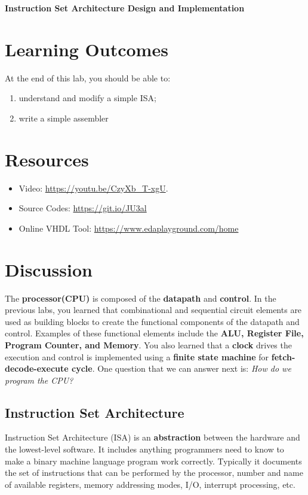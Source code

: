 \documentclass[a4paper, 11pt,oneside]{article}
\begin{document}
\begin{center}
	{\LARGE \textbf{Instruction Set Architecture Design and Implementation}}
\end{center}

\section*{Learning Outcomes}
   At the end of this lab, you should be able to:
   \begin{enumerate}[itemsep=0pt,parsep=0pt]
   	   \item understand and modify a simple ISA;
       \item write a simple assembler
   \end{enumerate}   
\tableofcontents

\section{Resources}
\begin{itemize}
	\item Video: \href{https://youtu.be/CzyXb_T-xgU}{https://youtu.be/CzyXb\_T-xgU}.
	\item Source Codes: \href{https://git.io/JU3al}{https://git.io/JU3al}
	\item Online VHDL Tool: \href{https://www.edaplayground.com/home}
	{https://www.edaplayground.com/home}
\end{itemize}	

\section{Discussion}
The \textbf{processor(CPU)} is composed of the \textbf{datapath} and 
\textbf{control}. In the previous labs, you learned that combinational and 
sequential circuit elements are used as building blocks to create the 
functional components of the datapath and control. Examples of these functional 
elements include the \textbf{ALU, Register File, Program Counter, and Memory}. 
You also learned that a \textbf{clock} drives the execution and control is 
implemented using a \textbf{finite state machine} for 
\textbf{fetch-decode-execute cycle}. One question that we can answer next is: 
\textit{How do we program the CPU?}


\subsection{Instruction Set Architecture}
Instruction Set Architecture (ISA) is an \textbf{abstraction} between the 
hardware and the lowest-level software. It includes anything programmers need 
to know to make a binary machine language program work correctly. Typically it  
documents the set of instructions that can be performed by the 
processor, number and name of available registers, memory 
addressing modes, I/O, interrupt processing, etc.
\end{document}
